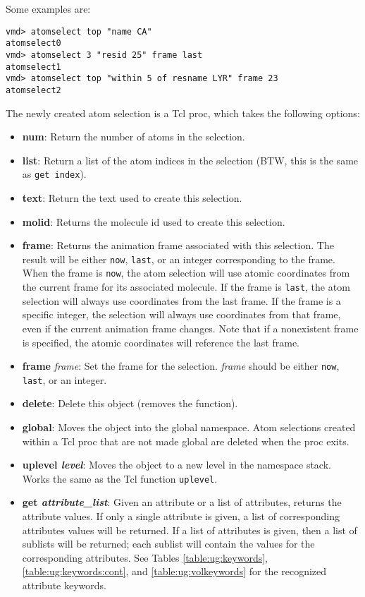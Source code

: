 \begin{itemize}
Some examples are:
\begin{verbatim}
vmd> atomselect top "name CA"
atomselect0
vmd> atomselect 3 "resid 25" frame last
atomselect1
vmd> atomselect top "within 5 of resname LYR" frame 23
atomselect2
\end{verbatim}

The newly created atom selection is a Tcl proc, which takes the following
options:

\begin{itemize}
    \item {\bf num}: Return the number of atoms in the selection.
   \item {\bf list}: Return a list of the atom indices in the selection 
	(BTW, this is the same as {\tt get index}).
\item {\bf text}: Return the text used to create this selection.
\item {\bf molid}: Returns the molecule id used to create this selection.
\item {\bf frame}: Returns the animation frame associated with this selection.  The
	result will be either {\tt now}, {\tt last}, or an integer corresponding
	to the frame.  When the frame is {\tt now}, the atom selection will use
	atomic coordinates from the current frame for its associated molecule.  If
	the frame is {\tt last}, the atom selection will always use coordinates 
	from the last frame.  If the frame is a specific integer, the selection
	will always use coordinates from that frame, even if the current animation
	frame changes.  Note that if a nonexistent frame is specified, the atomic
	coordinates will reference the last frame.
\item {\bf frame} {\it frame}: Set the frame for the selection.  {\it frame} should
	be either {\tt now}, {\tt last}, or an integer.  
\item {\bf delete}: Delete this object (removes the function). 
\item {\bf global}: Moves the object into the global namespace.  Atom 
	selections created within a Tcl proc that are not made global are 
	deleted when the proc exits.
\item {\bf uplevel {\it level}}: Moves the object to a new level in the 
	namespace stack.  Works the same as the Tcl function {\tt uplevel}.
\item {\bf get {\it attribute\_list}}: Given an attribute or a list of 
attributes, returns the attribute values.  If only a single attribute is
given, a list of corresponding attributes values will be returned.  If a
list of attributes is given, then a list of sublists will be returned;
each sublist will contain the values for the corresponding attributes.
See Tables \ref{table:ug:keywords}, \ref{table:ug:keywords:cont}, and
\ref{table:ug:volkeywords} for the 
recognized attribute keywords.


\end{itemize}
\end{itemize}
